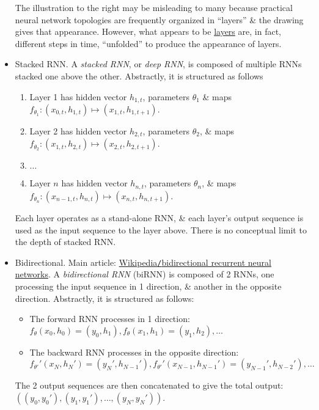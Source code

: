 \documentclass{article}
\begin{document}
\begin{itemize}
	The illustration to the right may be misleading to many because practical neural network topologies are frequently organized in ``layers'' \& the drawing gives that appearance. However, what appears to be \href{https://en.wikipedia.org/wiki/Layer_(deep_learning)}{layers} are, in fact, different steps in time, ``unfolded'' to produce the appearance of layers.
	\item {\sf Stacked RNN.} A {\it stacked RNN}, or {\it deep RNN}, is composed of multiple RNNs stacked one above the other. Abstractly, it is structured as follows
	\begin{enumerate}
		\item Layer 1 has hidden vector $h_{1,t}$, parameters $\theta_1$ \& maps $f_{\theta_1}:(x_{0,t},h_{1,t})\mapsto(x_{1,t},h_{1,t+1})$.
		\item Layer 2 has hidden vector $h_{2,t}$, parameters $\theta_2$, \& maps $f_{\theta_2}:(x_{1,t},h_{2,t})\mapsto(x_{2,t},h_{2,t+1})$.
		\item $\ldots$
		\item Layer $n$ has hidden vector $h_{n,t}$, parameters $\theta_n$, \& maps $f_{\theta_n}:(x_{n-1,t},h_{n,t})\mapsto(x_{n,t},h_{n,t+1})$.
	\end{enumerate}
	Each layer operates as a stand-alone RNN, \& each layer's output sequence is used as the input sequence to the layer above. There is no conceptual limit to the depth of stacked RNN.
	\item {\sf Bidirectional.} Main article: \href{https://en.wikipedia.org/wiki/Bidirectional_recurrent_neural_networks}{Wikipedia{\tt/}bidirectional recurrent neural networks}. A {\it bidirectional RNN} (biRNN) is composed of 2 RNNs, one processing the input sequence in 1 direction, \& another in the opposite direction. Abstractly, it is structured as follows:
	\begin{itemize}
		\item The forward RNN processes in 1 direction: $f_\theta(x_0,h_0) = (y_0,h_1),f_\theta(x_1,h_1) = (y_1,h_2),\ldots$
		\item The backward RNN processes in the opposite direction: $f_{\theta'}'(x_N,h_N') = (y_N',h_{N-1}'),f_{\theta'}'(x_{N-1},h_{N-1}') = (y_{N-1}',h_{N-2}'),\ldots$
	\end{itemize}
	The 2 output sequences are then concatenated to give the total output: $((y_0,y_0'),(y_1,y_1'),\ldots,(y_N,y_N'))$.
	

\end{itemize}
\end{document}
